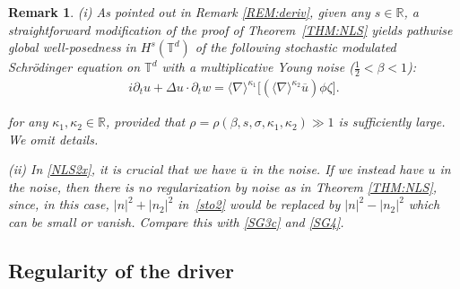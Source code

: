 \documentclass[letterpaper, 11pt,  reqno]{amsart}
\newtheorem{remark}[theorem]{Remark}
\newcommand{\1}{\hspace{0.5mm}\textup{I}\hspace{0.5mm}}
\newcommand{\noi}{\noindent}
\newcommand{\R}{\mathbb{R}}
\newcommand{\T}{\mathbb{T}}
\newcommand{\be}{\beta}
\newcommand{\nb}{\nabla}
\newcommand{\Dl}{\Delta}
\newcommand{\kk}{\kappa}
\newcommand{\s}{\sigma}
\newcommand{\cj}{\overline}
\newcommand{\dt}{\partial_t}
\newcommand{\jb}[1]
{\langle #1 \rangle}
\numberwithin{equation}{section}
\numberwithin{theorem}{section}
\begin{document}
\begin{remark}\rm



(i)
As pointed out in Remark \ref{REM:deriv}, 
given any $s \in \R$, 
a straightforward modification of the proof of Theorem~\ref{THM:NLS}
yields pathwise global well-posedness 
in $H^s(\T^d)$ of the following stochastic modulated Schr\"odinger equation
on $\T^d$
with a multiplicative Young noise ($\frac 12 < \be < 1$):
\begin{align*}
i \dt u+  \Dl  u \cdot \dt w =  \jb{\nb}^{\kk_1}\big[(\jb{\nb}^{\kk_2} \cj u) \phi \zeta\big].
\end{align*}




\noi
for any $\kk_1, \kk_2 \in \R $, 
provided that $\rho = \rho(\be,  s, \s, \kk_1, \kk_2)\gg1$
is sufficiently large.
We omit details.


\smallskip

\noi
(ii) In \eqref{NLS2x}, 
it is crucial that we have $\cj u$ in the noise.
If we instead have $u$ in the noise, 
then there is no regularization by noise
as in Theorem \ref{THM:NLS}, 
since, in this case, 
 $|n|^2 + |n_2|^2$ 
in~\eqref{sto2}
would be replaced by 
$|n|^2 - |n_2|^2$ 
which 
can be small or vanish.
Compare this with \eqref{SG3c} and \eqref{SG4}.


\end{remark}











\subsection{Regularity of the driver}
\label{SUBSEC:NLS1}
\end{document}
